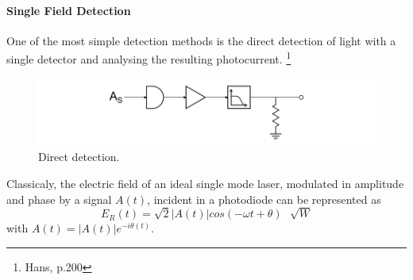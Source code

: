 \paragraph{Single Field Detection}
One of the most simple detection methods is the direct detection of light with a single detector and analysing the resulting photocurrent.
\footnote{Hans, p.200}
\begin{figure}[H]
	\label{fig:detection_direct}
	\centering
	\includegraphics{./sdf/quantum_noise/figures/detection-direct.pdf}
	\caption{Direct detection.}
\end{figure}
Classicaly, the electric field of an ideal single mode laser, modulated in amplitude and phase by a signal $A(t)$, incident in a photodiode can be represented as
\begin{equation}
    E_R(t)=\sqrt{2} |A(t)| cos\left(-\omega t + \theta\right) \,\,\,\, \sqrt{W}
\end{equation}
with $A(t)=|A(t)|e^{-i\theta(t)}$.

